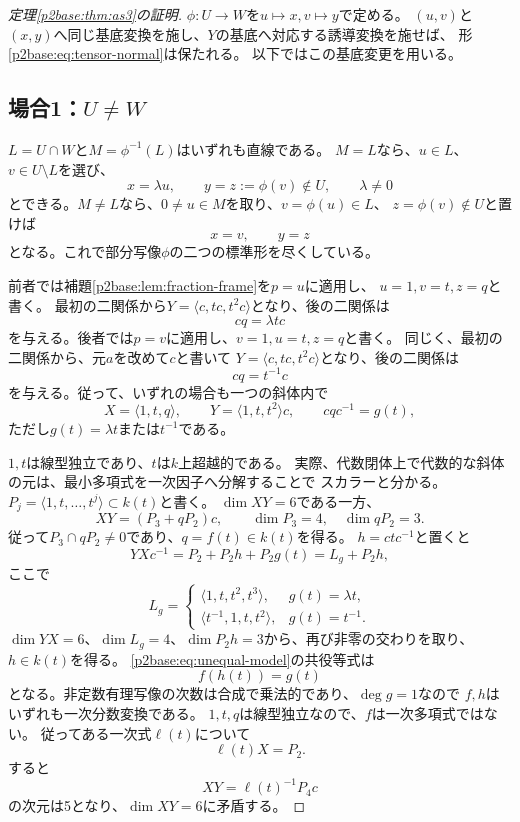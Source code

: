 \documentclass[11pt,a4paper]{ltjsarticle}
\theoremstyle{definition}
\begin{document}
\begin{proof}[定理\ref{p2base:thm:as3}の証明]
$\phi:U\to W$を$u\mapsto x,v\mapsto y$で定める。
$(u,v)$と$(x,y)$へ同じ基底変換を施し、$Y$の基底へ対応する誘導変換を施せば、
形\eqref{p2base:eq:tensor-normal}は保たれる。
以下ではこの基底変更を用いる。

\subsection*{場合1：$U\ne W$}

$L=U\cap W$と$M=\phi^{-1}(L)$はいずれも直線である。
$M=L$なら、$u\in L$、$v\in U\setminus L$を選び、
\[
x=\lambda u,\qquad y=z:=\phi(v)\notin U,\qquad\lambda\ne0
\]
とできる。$M\ne L$なら、$0\ne u\in M$を取り、$v=\phi(u)\in L$、
$z=\phi(v)\notin U$と置けば
\[
x=v,\qquad y=z
\]
となる。これで部分写像$\phi$の二つの標準形を尽くしている。

前者では補題\ref{p2base:lem:fraction-frame}を$p=u$に適用し、
$u=1,v=t,z=q$と書く。
最初の二関係から$Y=\langle c,tc,t^2c\rangle$となり、後の二関係は
\[
cq=\lambda tc
\]
を与える。後者では$p=v$に適用し、$v=1,u=t,z=q$と書く。
同じく、最初の二関係から、元$a$を改めて$c$と書いて
$Y=\langle c,tc,t^2c\rangle$となり、後の二関係は
\[
cq=t^{-1}c
\]
を与える。従って、いずれの場合も一つの斜体内で
\begin{equation}\label{p2base:eq:unequal-model}
X=\langle1,t,q\rangle,\qquad
Y=\langle1,t,t^2\rangle c,\qquad
cqc^{-1}=g(t),
\end{equation}
ただし$g(t)=\lambda t$または$t^{-1}$である。

$1,t$は線型独立であり、$t$は$k$上超越的である。
実際、代数閉体上で代数的な斜体の元は、最小多項式を一次因子へ分解することで
スカラーと分かる。
$P_j=\langle1,t,\ldots,t^j\rangle\subset k(t)$と書く。
$\dim XY=6$である一方、
\[
XY=(P_3+qP_2)c,\qquad \dim P_3=4,\quad\dim qP_2=3.
\]
従って$P_3\cap qP_2\ne0$であり、$q=f(t)\in k(t)$を得る。
$h=ctc^{-1}$と置くと
\[
YXc^{-1}=P_2+P_2h+P_2g(t)=L_g+P_2h,
\]
ここで
\[
L_g=
\begin{cases}
\langle1,t,t^2,t^3\rangle,&g(t)=\lambda t,\\
\langle t^{-1},1,t,t^2\rangle,&g(t)=t^{-1}.
\end{cases}
\]
$\dim YX=6$、$\dim L_g=4$、$\dim P_2h=3$から、再び非零の交わりを取り、
$h\in k(t)$を得る。
\eqref{p2base:eq:unequal-model}の共役等式は
\[
f(h(t))=g(t)
\]
となる。非定数有理写像の次数は合成で乗法的であり、$\deg g=1$なので
$f,h$はいずれも一次分数変換である。
$1,t,q$は線型独立なので、$f$は一次多項式ではない。
従ってある一次式$\ell(t)$について
\[
\ell(t)X=P_2.
\]
すると
\[
XY=\ell(t)^{-1}P_4c
\]
の次元は5となり、$\dim XY=6$に矛盾する。


\end{proof}
\end{document}
